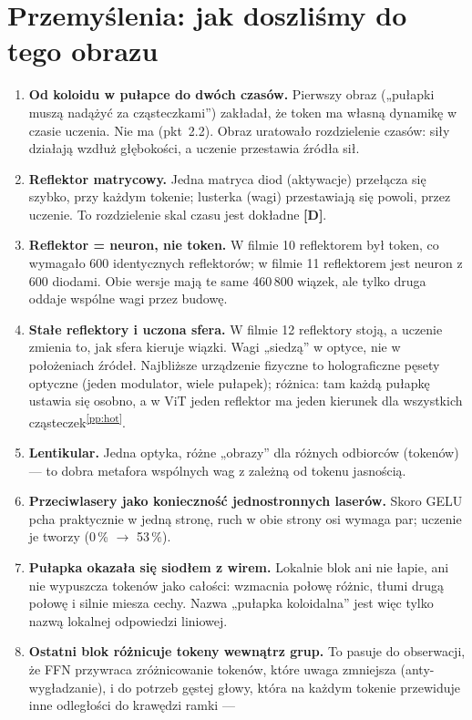 \documentclass[a4paper,11pt]{article}
\newcommand{\stD}{\textcolor{dok}{\textsf{\textbf{[D]}}}}
\newcommand{\pp}[1]{\textsuperscript{\ref{pp:#1}}}
\begin{document}
\section{Przemyślenia: jak doszliśmy do tego obrazu}
\begin{enumerate}
\item \textbf{Od koloidu w pułapce do dwóch czasów.} Pierwszy obraz („pułapki muszą nadążyć za cząsteczkami”) zakładał, że token ma
własną dynamikę w czasie uczenia. Nie ma (pkt~2.2). Obraz uratowało rozdzielenie czasów: siły działają wzdłuż głębokości, a uczenie
przestawia źródła sił.
\item \textbf{Reflektor matrycowy.} Jedna matryca diod (aktywacje) przełącza się szybko, przy każdym tokenie; lusterka (wagi)
przestawiają się powoli, przez uczenie. To rozdzielenie skal czasu jest dokładne \stD.
\item \textbf{Reflektor = neuron, nie token.} W filmie 10 reflektorem był token, co wymagało 600 identycznych reflektorów; w filmie 11
reflektorem jest neuron z 600 diodami. Obie wersje mają te same 460\,800 wiązek, ale tylko druga oddaje wspólne wagi przez budowę.
\item \textbf{Stałe reflektory i uczona sfera.} W filmie 12 reflektory stoją, a uczenie zmienia to, jak sfera kieruje wiązki. Wagi
„siedzą” w optyce, nie w położeniach źródeł. Najbliższe urządzenie fizyczne to holograficzne pęsety optyczne (jeden modulator, wiele
pułapek); różnica: tam każdą pułapkę ustawia się osobno, a w ViT jeden reflektor ma jeden kierunek dla wszystkich cząsteczek\pp{hot}.
\item \textbf{Lentikular.} Jedna optyka, różne „obrazy” dla różnych odbiorców (tokenów) --- to dobra metafora wspólnych wag z zależną
od tokenu jasnością.
\item \textbf{Przeciwlasery jako konieczność jednostronnych laserów.} Skoro GELU pcha praktycznie w jedną stronę, ruch w obie strony
osi wymaga par; uczenie je tworzy (0\,\% $\to$ 53\,\%).
\item \textbf{Pułapka okazała się siodłem z wirem.} Lokalnie blok ani nie łapie, ani nie wypuszcza tokenów jako całości: wzmacnia
połowę różnic, tłumi drugą połowę i silnie miesza cechy. Nazwa „pułapka koloidalna” jest więc tylko nazwą lokalnej odpowiedzi liniowej.
\item \textbf{Ostatni blok różnicuje tokeny wewnątrz grup.} To pasuje do obserwacji, że FFN przywraca zróżnicowanie tokenów, które
uwaga zmniejsza (anty-wygładzanie), i do potrzeb gęstej głowy, która na każdym tokenie przewiduje inne odległości do krawędzi ramki ---

\end{enumerate}
\end{document}
